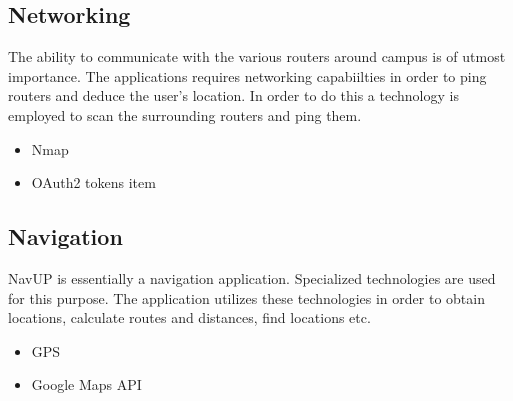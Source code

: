 \documentclass{article}
\begin{document}
	\subsection{Networking}	
The ability to communicate with the various routers around campus is of utmost importance.  The applications requires networking capabiilties in order to ping routers and deduce the user's location.  In order to do this a technology is employed to scan the surrounding routers and ping them.
		\begin{itemize}
			\item Nmap
			\item OAuth2 tokens
item
		\end{itemize}
	\subsection{Navigation}
NavUP is essentially a navigation application.  Specialized technologies are used for this purpose.  The application utilizes these technologies in order to obtain locations, calculate routes and distances, find locations etc.  
		\begin{itemize}
			\item GPS
			\item Google Maps API
		\end{itemize}
\end{document}
